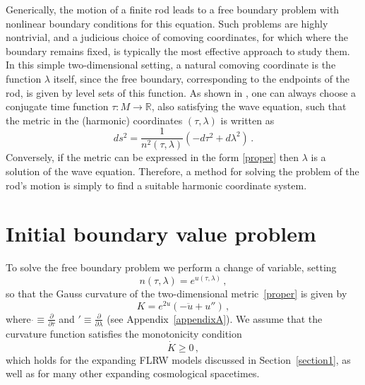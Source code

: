 \documentclass[10pt]{amsart}
\newcommand{\bbR}{\mathbb{R}}      %
\begin{document}
Generically, the motion of a finite rod leads to a free boundary problem with nonlinear boun\-da\-ry conditions for this equation.
Such problems are highly nontrivial, and a judicious choice of comoving coordinates, for which where the boundary remains fixed, is typically the most effective approach to study them. In this simple two-dimensional setting, a natural comoving coordinate is the function $\lambda$ itself, since the free boundary, corresponding to the endpoints of the rod, is given by level sets of this function. As shown in \cite{Natario14}, one can always choose a conjugate time function $\tau:M \to \bbR$, also satisfying the wave equation, such that the metric in the (harmonic) coordinates $(\tau,\lambda)$ is written as
%
\begin{equation} \label{proper}
ds^2 = \frac{1}{n^2(\tau,\lambda)} \left( - d\tau^2 + d\lambda^2 \right) \, .
\end{equation}
%
Conversely, if the metric can be expressed in the form \eqref{proper} then $\lambda$ is a solution of the wave equation. Therefore, a method for solving the problem of the rod's motion is simply to find a suitable harmonic coordinate system.
%
%
\section{Initial boundary value problem}\label{section3}
%
To solve the free boundary problem we perform a change of variable, setting
\begin{equation}
n(\tau,\lambda) = e^{u(\tau,\lambda)} \, ,
\end{equation}
so that the Gauss curvature of the two-dimensional metric~\eqref{proper} is given by
\begin{equation}
K = e^{2u} \left( - \ddot{u} + u'' \right) \, ,
\end{equation}
where $\dot{} \equiv \frac{\partial}{\partial \tau}$ and ${}' \equiv \frac{\partial}{\partial \lambda}$ (see Appendix~\ref{appendixA}). We assume that the curvature function satisfies the monotonicity condition
\begin{equation}
\dot{K} \geq 0 \, ,
\end{equation}
which holds for the expanding FLRW models discussed in Section~\ref{section1}, as well as for many other expanding cosmological spacetimes.
\end{document}
